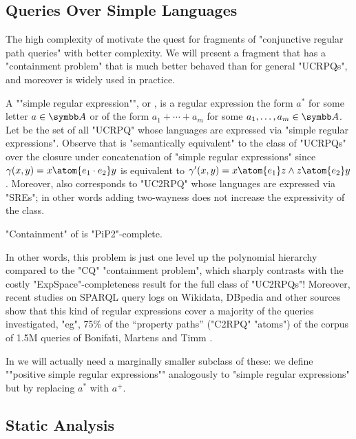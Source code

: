\subsection{Queries Over Simple Languages}

The high complexity of  motivate
the quest for fragments of "conjunctive regular path queries" with better complexity.
We will present a fragment {\UCRPQSRE} that
has a "containment problem" that is much better behaved than for general "UCRPQs",
and moreover is widely used in practice.

\AP A ""simple regular expression"", or , is a regular expression the form $a^*$ for some letter $a \in \A$ or of the form $a_1 + \dotsb + a_m$ for some $a_1, \dotsc, a_m \in \A$. 
\AP Let \intro*{\UCRPQSRE} be the set of all "UCRPQ" whose languages are expressed via "simple regular expressions". Observe that {\UCRPQSRE} is "semantically equivalent" to the class of "UCRPQs" over the closure under concatenation of "simple regular expressions"
since $\gamma(x,y) = x \atom{e_1 \cdot e_2} y$ is equivalent to $\gamma'(x,y) = x \atom{e_1} z \land  z \atom{e_2} y$.
Moreover, \UCRPQSRE{} also corresponds to "UC2RPQ" whose languages are expressed via "SREs";
in other words adding two-wayness does not increase the expressivity of the class. 

\begin{proposition}
    "Containment" of {\UCRPQSRE} is "PiP2"-complete.
\end{proposition}

In other words, this problem is just one level up the polynomial hierarchy compared to the "CQ" "containment problem", which sharply contrasts with the costly "ExpSpace"-completeness result
for the full class of "UC2RPQs"!
Moreover, recent studies on SPARQL query logs on Wikidata, DBpedia and other sources show that this kind of regular expressions cover a majority of the queries investigated, "eg", 75\% of
the ``property paths'' ("C2RPQ" "atoms") of the corpus of 1.5M queries of Bonifati, Martens and Timm \cite[Table 15]{BonifatiMartensTimm2020SPARQL}.

In  we will actually need a marginally smaller subclass of these:
we define \AP""positive simple regular expressions"" analogously to
"simple regular expressions" but by replacing $a^*$ with $a^+$.

\subsection{Static Analysis}

